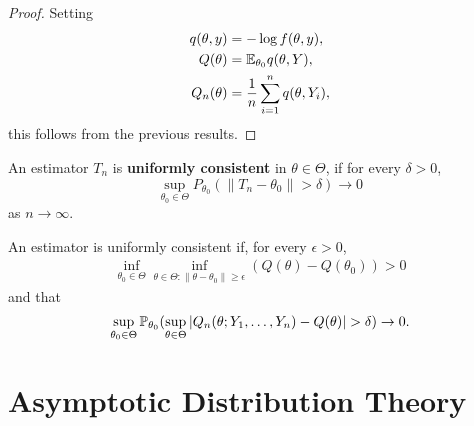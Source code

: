 \begin{proof}
  Setting
  \begin{align}
    q(\theta, y) &= -\log f(\theta, y), \\
    Q(\theta) &= \E_{\theta_{0}}q(\theta, Y), \\
    Q_{n}(\theta) &= \frac{1}{n} \sum_{i=1}^{n} q(\theta, Y_{i}),
  \end{align}
  this follows from the previous results.
\end{proof}

\begin{defn}
  \label{sec:cons-model-ftheta}
  An estimator $T_{n}$ is \textbf{uniformly consistent} in $\theta \in
  \Theta$, if for every $\delta > 0$,
  \begin{equation}
    \label{eq:25}
    \sup_{\theta_{0} \in \Theta} P_{\theta_{0}}(\| T_{n} - \theta_{0}
    \| > \delta) \rightarrow 0
  \end{equation} as $n \rightarrow \infty$.
\end{defn}

\begin{thm}
  An estimator is uniformly consistent if, for every $\epsilon > 0$,
  \begin{align}
    \label{eq:44}
    \inf_{\theta_{0} \in \Theta} \inf_{\theta \in \Theta : \| \theta -
    \theta_{0} \| \geq \epsilon} (Q(\theta) - Q(\theta_{0})) > 0
  \end{align} and that
  \begin{align}
    \label{eq:46}
    \sup_{\theta_{0} \in \Theta} \Prob_{\theta_{0}} (\sup_{\theta \in
      \Theta} |Q_{n}(\theta; Y_{1}, \dots, Y_{n}) - Q(\theta) | >
    \delta) \rightarrow 0.
  \end{align}
\end{thm}

\section{Asymptotic Distribution Theory}
\label{sec:asympt-distr-theory-2}

